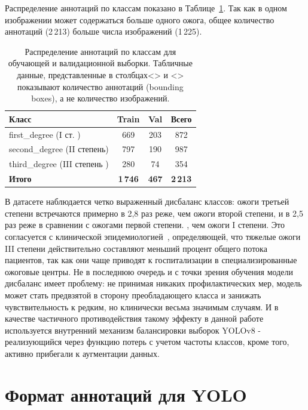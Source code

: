 Распределение аннотаций по классам показано в Таблице~\ref{tab:distribution}. Так как в одном изображении может содержаться больше одного ожога, общее количество аннотаций (2\,213) больше числа изображений (1\,225).

\begin{table}[H]
\centering
\caption{Распределение аннотаций по классам для обучающей и валидационной выборки. Табличные данные, представленные в столбцах<> и <> показывают количество аннотаций (bounding boxes), а не количество изображений.}
\label{tab:distribution}
\begin{tabular}{lccc}
\toprule
\textbf{Класс} & \textbf{Train} & \textbf{Val} & \textbf{Всего} \\
\midrule
first\_degree (I ст. ) & 669 & 203 & 872 \\
second\_degree (II степень) & 797 & 190 & 987 \\
third\_degree (III степень ) & 280 & 74 & 354 \\
\midrule
\textbf{Итого} & \textbf{1\,746} & \textbf{467} & \textbf{2\,213} \\
\bottomrule
\end{tabular}
\end{table}

В датасете наблюдается четко выраженный дисбаланс классов: ожоги третьей степени встречаются примерно в 2{,}8 раз реже, чем ожоги второй степени, и в 2{,}5 раз реже в сравнении с ожогами первой степени. , чем ожоги I степени. Это согласуется с клинической эпидемиологией~\cite{peck2012burns}, определяющей, что тяжелые ожоги III степени действительно составляют меньший процент общего потока пациентов, так как они чаще приводят к госпитализации в специализированные ожоговые центры. Не в последнюю очередь и с точки зрения обучения модели дисбаланс имеет проблему: не принимая никаких профилактических мер, модель может стать предвзятой в сторону преобладающего класса и занижать чувствительность к редким, но клинически весьма значимым случаям. И в качестве частичного противодействия такому эффекту в данной работе используется внутренний механизм балансировки выборок YOLOv8 - реализующийся через функцию потерь с учетом частоты классов, кроме того, активно прибегали к аугментации данных. \section{Формат аннотаций для YOLO}

